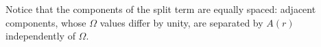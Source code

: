 Notice that the components of the split term are equally spaced: adjacent components, whose $\Omega$ values differ by unity, are separated by $A(r)$ independently of $\Omega$.
